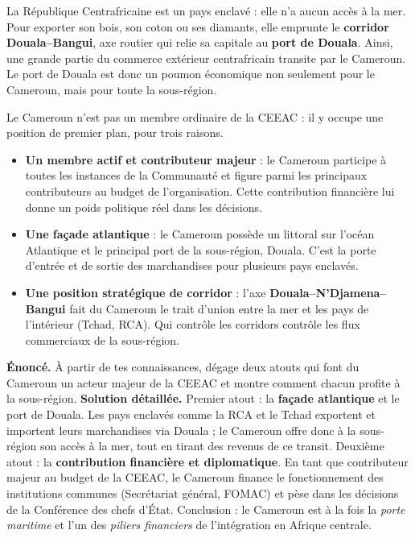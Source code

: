 \documentclass[11pt]{article}
\newcommand{\cle}[1]{{\popxbold\color{popdark}#1}}
\newcounter{popsec}
\newcounter{popsub}
\newcommand{\courssub}[1]{%
  \stepcounter{popsub}%
  \par\vspace{9pt}\noindent{\popxbold\fontsize{11.5}{13}\selectfont\color{popink}{\color{poporange}\thepopsec.\thepopsub}\hspace{6pt}#1}\par\nopagebreak\vspace{4pt}
}
\begin{document}
\begin{savaistu}
La République Centrafricaine est un pays \cle{enclavé} : elle n'a aucun accès à la mer. Pour exporter son bois, son coton ou ses diamants, elle emprunte le \textbf{corridor Douala--Bangui}, axe routier qui relie sa capitale au \textbf{port de Douala}. Ainsi, une grande partie du commerce extérieur centrafricain transite par le Cameroun. Le port de Douala est donc un poumon économique non seulement pour le Cameroun, mais pour toute la sous-région.
\end{savaistu}

\courssub{La place du Cameroun dans la CEEAC}

Le Cameroun n'est pas un membre ordinaire de la CEEAC : il y occupe une position de premier plan, pour trois raisons.

\begin{itemize}
\item \textbf{Un membre actif et contributeur majeur} : le Cameroun participe à toutes les instances de la Communauté et figure parmi les principaux contributeurs au budget de l'organisation. Cette contribution financière lui donne un poids politique réel dans les décisions.
\item \textbf{Une façade atlantique} : le Cameroun possède un littoral sur l'océan Atlantique et le principal port de la sous-région, Douala. C'est la porte d'entrée et de sortie des marchandises pour plusieurs pays enclavés.
\item \textbf{Une position stratégique de corridor} : l'axe \textbf{Douala--N'Djamena--Bangui} fait du Cameroun le trait d'union entre la mer et les pays de l'intérieur (Tchad, RCA). Qui contrôle les corridors contrôle les flux commerciaux de la sous-région.
\end{itemize}

\begin{exoresolu}
\textbf{Énoncé.} À partir de tes connaissances, dégage deux atouts qui font du Cameroun un acteur majeur de la CEEAC et montre comment chacun profite à la sous-région.
\tcblower
\textbf{Solution détaillée.} Premier atout : la \textbf{façade atlantique} et le port de Douala. Les pays enclavés comme la RCA et le Tchad exportent et importent leurs marchandises via Douala ; le Cameroun offre donc à la sous-région son accès à la mer, tout en tirant des revenus de ce transit. Deuxième atout : la \textbf{contribution financière et diplomatique}. En tant que contributeur majeur au budget de la CEEAC, le Cameroun finance le fonctionnement des institutions communes (Secrétariat général, FOMAC) et pèse dans les décisions de la Conférence des chefs d'État. Conclusion : le Cameroun est à la fois la \emph{porte maritime} et l'un des \emph{piliers financiers} de l'intégration en Afrique centrale.
\end{exoresolu}
\end{document}
